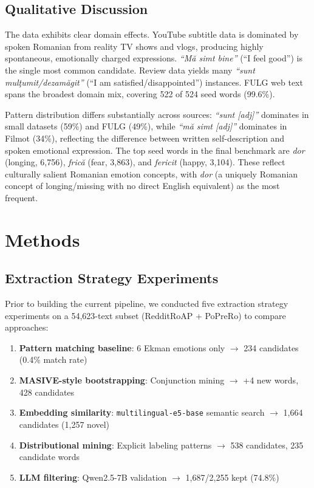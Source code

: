 \documentclass[11pt]{article}
\begin{document}
\subsection{Qualitative Discussion}

The data exhibits clear domain effects. YouTube subtitle data is dominated by spoken Romanian from reality TV shows and vlogs, producing highly spontaneous, emotionally charged expressions. \textit{``M\u{a} simt bine''} (``I feel good'') is the single most common candidate. Review data yields many \textit{``sunt mul\c{t}umit/dezam\u{a}git''} (``I am satisfied/disappointed'') instances. FULG web text spans the broadest domain mix, covering 522 of 524 seed words (99.6\%).

Pattern distribution differs substantially across sources: \textit{``sunt [adj]''} dominates in small datasets (59\%) and FULG (49\%), while \textit{``m\u{a} simt [adj]''} dominates in Filmot (34\%), reflecting the difference between written self-description and spoken emotional expression. The top seed words in the final benchmark are \textit{dor} (longing, 6,756), \textit{fric\u{a}} (fear, 3,863), and \textit{fericit} (happy, 3,104). These reflect culturally salient Romanian emotion concepts, with \textit{dor} (a uniquely Romanian concept of longing/missing with no direct English equivalent) as the most frequent.


\section{Methods}

\subsection{Extraction Strategy Experiments}

Prior to building the current pipeline, we conducted five extraction strategy experiments on a 54,623-text subset (RedditRoAP + PoPreRo) to compare approaches:

\begin{enumerate}
    \item \textbf{Pattern matching baseline}: 6 Ekman emotions only $\rightarrow$ 234 candidates (0.4\% match rate)
    \item \textbf{MASIVE-style bootstrapping}: Conjunction mining $\rightarrow$ +4 new words, 428 candidates
    \item \textbf{Embedding similarity}: \texttt{multilingual-e5-base} semantic search $\rightarrow$ 1,664 candidates (1,257 novel)
    \item \textbf{Distributional mining}: Explicit labeling patterns $\rightarrow$ 538 candidates, 235 candidate words
    \item \textbf{LLM filtering}: Qwen2.5-7B validation $\rightarrow$ 1,687/2,255 kept (74.8\%)
\end{enumerate}
\end{document}
